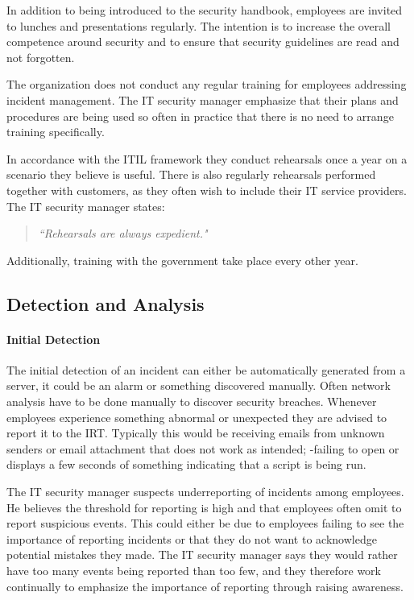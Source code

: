 In addition to being introduced to the security handbook, employees are invited to lunches and presentations regularly. The intention is to increase the overall competence around security and to ensure that security guidelines are read and not forgotten. 

The organization does not conduct any regular training for employees addressing incident management. The IT security manager emphasize that their plans and procedures are being used so often in practice that there is no need to arrange training specifically. 

In accordance with the ITIL framework they conduct rehearsals once a year on a scenario they believe is useful. There is also regularly rehearsals performed   together with customers, as they often wish to include their IT service providers. The IT security manager states:
\begin{quote}
\textit{``Rehearsals are always expedient."}
\end{quote}
Additionally, training with the government take place every other year. 

\subsection{Detection and Analysis}
\paragraph{Initial Detection}
The initial detection of an incident can either be automatically generated from a server, it could be an alarm or something discovered manually. Often network analysis have to be done manually to discover security breaches. Whenever employees experience something abnormal or unexpected they are advised to report it to the \ac{IRT}. Typically this would be receiving emails from unknown senders or email attachment that does not work as intended; -failing to open or displays a few seconds of something indicating that a script is being run.

The IT security manager suspects underreporting of incidents among employees. He believes the threshold for reporting is high and that employees often omit to report suspicious events. This could either be due to employees failing to see the importance of reporting incidents or that they do not want to acknowledge potential mistakes they made. The IT security manager says they would rather have too many events being reported than too few, and they therefore work continually to emphasize the importance of reporting through raising awareness.

